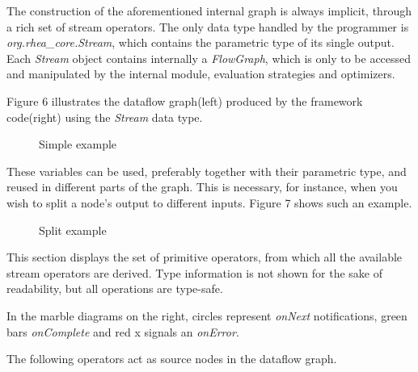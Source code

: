 \documentclass{dithesis}
\begin{document}

The construction of the aforementioned internal graph is always implicit, through a rich set of stream operators. The only data type handled by the programmer is \textit{org.rhea\_core.Stream}, which contains the parametric type of its single output. Each \textit{Stream} object contains internally a \textit{FlowGraph}, which is only to be accessed and manipulated by the internal module, evaluation strategies and optimizers.

Figure 6 illustrates the dataflow graph(left) produced by the framework code(right) using the \textit{Stream} data type.

\begin{figure}[h!] 
	\begin{multicols}{2}
	\resizebox{0.5\textwidth}{!}{
			
	}
	\end{multicols}
	\caption{Simple example}
\end{figure}

These variables can be used, preferably together with their parametric type, and reused in different parts of the graph. This is necessary, for instance, when you wish to split a node's output to different inputs. Figure 7 shows such an example.

\begin{figure}[h!] 
	\begin{multicols}{2}
	\resizebox{0.5\textwidth}{!}{
			
	}
	\end{multicols}
	\caption{Split example}
\end{figure}

This section displays the set of primitive operators, from which all the available stream operators are derived. Type information is not shown for the sake of readability, but all operations are type-safe.

In the marble diagrams on the right, circles represent \textit{onNext} notifications, green bars \textit{onComplete} and red x signals an \textit{onError}.

\newcommand{\lll}{0.4\linewidth}
\newcommand{\rrr}{0.4\linewidth}

The following operators act as source nodes in the dataflow graph.
\begin{description}
\end{description}
\end{document}
